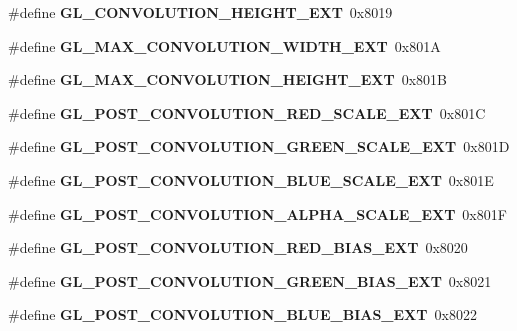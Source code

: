 \begin{DoxyCompactItemize}
\item 
\#define {\bfseries G\+L\+\_\+\+C\+O\+N\+V\+O\+L\+U\+T\+I\+O\+N\+\_\+\+H\+E\+I\+G\+H\+T\+\_\+\+E\+X\+T}~0x8019\label{_s_d_l__opengl_8h_ac9c8dfbc399f7d99feee34e74d82cdfc}

\item 
\#define {\bfseries G\+L\+\_\+\+M\+A\+X\+\_\+\+C\+O\+N\+V\+O\+L\+U\+T\+I\+O\+N\+\_\+\+W\+I\+D\+T\+H\+\_\+\+E\+X\+T}~0x801\+A\label{_s_d_l__opengl_8h_ace854e040a07ad50b4442c9c82c0c9b2}

\item 
\#define {\bfseries G\+L\+\_\+\+M\+A\+X\+\_\+\+C\+O\+N\+V\+O\+L\+U\+T\+I\+O\+N\+\_\+\+H\+E\+I\+G\+H\+T\+\_\+\+E\+X\+T}~0x801\+B\label{_s_d_l__opengl_8h_a2f1cf69a9ee2712f3229481c21e2c1d8}

\item 
\#define {\bfseries G\+L\+\_\+\+P\+O\+S\+T\+\_\+\+C\+O\+N\+V\+O\+L\+U\+T\+I\+O\+N\+\_\+\+R\+E\+D\+\_\+\+S\+C\+A\+L\+E\+\_\+\+E\+X\+T}~0x801\+C\label{_s_d_l__opengl_8h_af82b1b23c812abd694889a8c8c8350ec}

\item 
\#define {\bfseries G\+L\+\_\+\+P\+O\+S\+T\+\_\+\+C\+O\+N\+V\+O\+L\+U\+T\+I\+O\+N\+\_\+\+G\+R\+E\+E\+N\+\_\+\+S\+C\+A\+L\+E\+\_\+\+E\+X\+T}~0x801\+D\label{_s_d_l__opengl_8h_ac5c1787c53b8ae362b1ad9ffc48e7855}

\item 
\#define {\bfseries G\+L\+\_\+\+P\+O\+S\+T\+\_\+\+C\+O\+N\+V\+O\+L\+U\+T\+I\+O\+N\+\_\+\+B\+L\+U\+E\+\_\+\+S\+C\+A\+L\+E\+\_\+\+E\+X\+T}~0x801\+E\label{_s_d_l__opengl_8h_a0f478556904d63d5ba8f641477d058bd}

\item 
\#define {\bfseries G\+L\+\_\+\+P\+O\+S\+T\+\_\+\+C\+O\+N\+V\+O\+L\+U\+T\+I\+O\+N\+\_\+\+A\+L\+P\+H\+A\+\_\+\+S\+C\+A\+L\+E\+\_\+\+E\+X\+T}~0x801\+F\label{_s_d_l__opengl_8h_ac7ae2cf65b441f57fe4389e67cd9debe}

\item 
\#define {\bfseries G\+L\+\_\+\+P\+O\+S\+T\+\_\+\+C\+O\+N\+V\+O\+L\+U\+T\+I\+O\+N\+\_\+\+R\+E\+D\+\_\+\+B\+I\+A\+S\+\_\+\+E\+X\+T}~0x8020\label{_s_d_l__opengl_8h_a3cdab3cd7758e5580bfaeb9bb013dd6d}

\item 
\#define {\bfseries G\+L\+\_\+\+P\+O\+S\+T\+\_\+\+C\+O\+N\+V\+O\+L\+U\+T\+I\+O\+N\+\_\+\+G\+R\+E\+E\+N\+\_\+\+B\+I\+A\+S\+\_\+\+E\+X\+T}~0x8021\label{_s_d_l__opengl_8h_af3d90c54dacceb622447e22800640328}

\item 
\#define {\bfseries G\+L\+\_\+\+P\+O\+S\+T\+\_\+\+C\+O\+N\+V\+O\+L\+U\+T\+I\+O\+N\+\_\+\+B\+L\+U\+E\+\_\+\+B\+I\+A\+S\+\_\+\+E\+X\+T}~0x8022\label{_s_d_l__opengl_8h_a8a2778a1baaff61c1e9ab5ad90be4546}


\end{DoxyCompactItemize}

